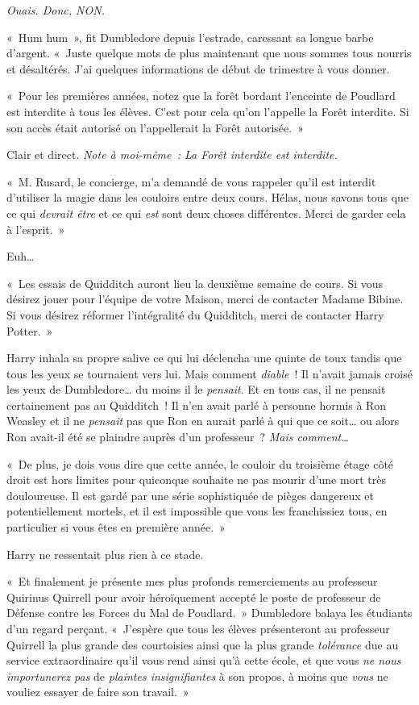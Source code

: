 \emph{Ouais. Donc, NON.}

«~Hum hum~», fit Dumbledore depuis l'estrade, caressant sa longue barbe d'argent.
«~Juste quelque mots de plus maintenant que nous sommes tous nourris et désaltérés.
J'ai quelques informations de début de trimestre à vous donner.

«~Pour les premières années, notez que la forêt bordant l'enceinte de Poudlard est interdite à tous les élèves.
C'est pour cela qu'on l'appelle la Forêt interdite.
Si son accès était autorisé on l'appellerait la Forêt autorisée.~»

Clair et direct. \emph{Note à moi-même~: La Forêt interdite est interdite.}

«~M. Rusard, le concierge, m'a demandé de vous rappeler qu'il est interdit d'utiliser la magie dans les couloirs entre deux cours.
Hélas, nous savons tous que ce qui \emph{devrait être} et ce qui \emph{est} sont deux choses différentes.
Merci de garder cela à l'esprit.~»

Euh…

«~Les essais de Quidditch auront lieu la deuxième semaine de cours.
Si vous désirez jouer pour l'équipe de votre Maison, merci de contacter Madame Bibine.
Si vous désirez réformer l'intégralité du Quidditch, merci de contacter Harry Potter.~»

Harry inhala sa propre salive ce qui lui déclencha une quinte de toux tandis que tous les yeux se tournaient vers lui.
Mais comment \emph{diable}~!
Il n'avait jamais croisé les yeux de Dumbledore… du moins il le \emph{pensait}.
Et en tous cas, il ne pensait certainement pas au Quidditch~!
Il n'en avait parlé à personne hormis à Ron Weasley et il ne \emph{pensait} pas que Ron en aurait parlé à qui que ce soit… ou alors Ron avait-il été se plaindre auprès d'un professeur~?
\emph{Mais comment…}

«~De plus, je dois vous dire que cette année, le couloir du troisième étage côté droit est hors limites pour quiconque souhaite ne pas mourir d'une mort très douloureuse.
Il est gardé par une série sophistiquée de pièges dangereux et potentiellement mortels, et il est impossible que vous les franchissiez tous, en particulier si vous êtes en première année.~»

Harry ne ressentait plus rien à ce stade.

«~Et finalement je présente mes plus profonds remerciements au professeur Quirinus Quirrell pour avoir héroïquement accepté le poste de professeur de Défense contre les Forces du Mal de Poudlard.~»
Dumbledore balaya les étudiants d'un regard perçant.
«~J'espère que tous les élèves présenteront au professeur Quirrell la plus grande des courtoisies ainsi que la plus grande \emph{tolérance} due au service extraordinaire qu'il vous rend ainsi qu'à cette école, et que vous \emph{ne nous importunerez pas} de \emph{plaintes insignifiantes} à son propos, à moins que \emph{vous} ne vouliez essayer de faire son travail.~»

